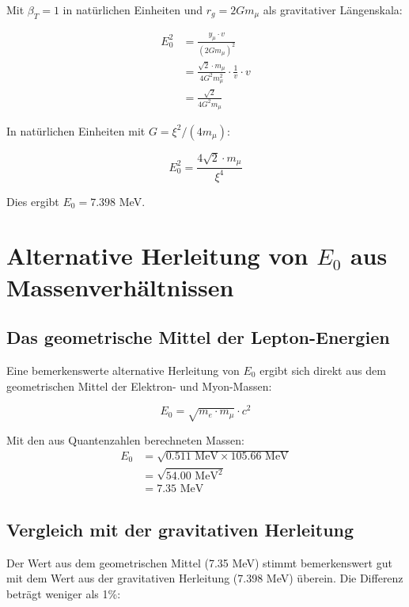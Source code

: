 \documentclass[12pt,a4paper]{article}
\theoremstyle{definition}
\begin{document}
	Mit $\beta_T = 1$ in nat\"urlichen Einheiten und $r_g = 2Gm_\mu$ als gravitativer L\"angenskala:
	
	\begin{align}
		E_0^2 &= \frac{y_\mu \cdot v}{(2Gm_\mu)^2}\\
		&= \frac{\sqrt{2} \cdot m_\mu}{4G^2 m_\mu^2} \cdot \frac{1}{v} \cdot v\\
		&= \frac{\sqrt{2}}{4G^2 m_\mu}
	\end{align}
	
	In nat\"urlichen Einheiten mit $G = \xi^2/(4m_\mu)$:
	
	\begin{equation}
		E_0^2 = \frac{4\sqrt{2} \cdot m_\mu}{\xi^4}
	\end{equation}
	
	Dies ergibt $E_0 = 7.398$ MeV.
	
	\section{Alternative Herleitung von $E_0$ aus Massenverh\"altnissen}
	
	\subsection{Das geometrische Mittel der Lepton-Energien}
	
	Eine bemerkenswerte alternative Herleitung von $E_0$ ergibt sich direkt aus dem geometrischen Mittel der Elektron- und Myon-Massen:
	
	\begin{equation}
		E_0 = \sqrt{m_e \cdot m_\mu} \cdot c^2
	\end{equation}
	
	Mit den aus Quantenzahlen berechneten Massen:
	\begin{align}
		E_0 &= \sqrt{0.511 \text{ MeV} \times 105.66 \text{ MeV}}\\
		&= \sqrt{54.00 \text{ MeV}^2}\\
		&= 7.35 \text{ MeV}
	\end{align}
	
	\subsection{Vergleich mit der gravitativen Herleitung}
	
	Der Wert aus dem geometrischen Mittel (7.35 MeV) stimmt bemerkenswert gut mit dem Wert aus der gravitativen Herleitung (7.398 MeV) \"uberein. Die Differenz betr\"agt weniger als 1\%:
	
\end{document}
